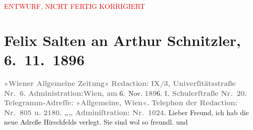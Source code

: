 
\begin{center}
            \textcolor{red}{ENTWURF, NICHT FERTIG KORRIGIERT}
                      \end{center}
            
         
         \renewcommand{\erwaehntePersonen}{Personen: Georg Hirschfeld}
         \renewcommand{\erwaehnteInstitutionen}{Institutionen: Wiener Allgemeine Zeitung}
         \renewcommand{\erwaehnteOrte}{Orte: Berlin, Schulerstraße, Universitätsstraße, Wien}
         \renewcommand{\erwaehnteWerke}{Werke: Die Mütter. Schauspiel in vier Acten}
               \section[Felix Salten an Arthur Schnitzler, 6. 11. 1896]{ Felix Salten an Arthur Schnitzler, 6. 11. 1896}\nopagebreak{}\rehead{ }\begin{ledgroupsized}[t]{13cm}\normalsize\beginnumbering \toendnotes[C]{\smallbreak\pagebreak[2]} 
\toendnotes[C]{\smallbreak}\pstart
           \noindent{}{\pb}\textcolor{gray}{\textbf{\textbf{»Wiener Allgemeine
                        Zeitung«}}}\pend
           \pstart
           \textcolor{gray}{\textbf{Redaction:}}\pend
           \pstart
           \textcolor{gray}{\textbf{\textbf{IX/3, Univerſitätsstraße Nr. 6.}}}\pend
           \pstart
           \textcolor{gray}{\textbf{Administration:}}\hfill \textcolor{gray}{\textbf{Wien, am}}{ }6. Nov. \textcolor{gray}{\textbf{189}}6.\pend
           \pstart
           \textcolor{gray}{\textbf{\textbf{I. Schulerſtraße Nr. 20. }}}\pend
           \pstart
           \textcolor{gray}{\textbf{Telegramm-Adreſſe: »Allgemeine, Wien«.}}\pend
           \pstart
           \textcolor{gray}{\textbf{Telephon der Redaction: Nr. 805 u. 2180.}}\pend
           \pstart
           \textcolor{gray}{\textbf{\hspace*{2.5em}„\hspace*{2.5em}„\hspace*{2.5em} Adminiſtration: Nr. 1024.}}\pend
           \pstart
           Lieber Freund, ich hab die neue Adreße Hirschfelds verlegt. Sie sind wol so freundl. und \label{K_L03187-1v}
\end{ledgroupsized}

